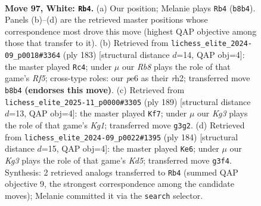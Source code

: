 \documentclass[11pt]{article}
\begin{document}
\clearpage

\begin{figure}[p]\centering
\begin{subfigure}{0.46\textwidth}\centering
\resizebox{\linewidth}{!}{%
\newchessgame
\chessboard[
  setfen={1R6/2k5/4pp1R/8/4P3/5PK1/8/r7 w - - 6 97},
  showmover=false,
  pgfstyle=straightmove, color=movearrow, markmove={b8-b4}
]}
\caption{}
\end{subfigure}\hfill
\begin{subfigure}{0.46\textwidth}\centering
\resizebox{\linewidth}{!}{%
\newchessgame
\chessboard[
  setfen={8/6k1/6p1/7p/5r1P/8/7R/4K3 b - - 45 92},
  showmover=false,
  pgfstyle=straightmove, color=movearrow, markmove={f4-c4}
]}
\caption{}
\end{subfigure}
\\[4pt]
\begin{subfigure}{0.46\textwidth}\centering
\resizebox{\linewidth}{!}{%
\newchessgame
\chessboard[
  setfen={R5k1/6p1/7p/7P/6P1/1r6/5K2/8 b - - 46 95},
  showmover=false,
  pgfstyle=straightmove, color=movearrow, markmove={g8-f7}
]}
\caption{}
\end{subfigure}\hfill
\begin{subfigure}{0.46\textwidth}\centering
\resizebox{\linewidth}{!}{%
\newchessgame
\chessboard[
  setfen={5k2/1R4p1/7p/3KP2P/r7/8/8/8 w - - 4 93},
  showmover=false,
  pgfstyle=straightmove, color=movearrow, markmove={d5-e6}
]}
\caption{}
\end{subfigure}
\caption{\textbf{Move 97, White: \texttt{Rb4}.} (a) Our position; Melanie plays \texttt{Rb4} (\texttt{b8b4}). Panels (b)--(d) are the retrieved master positions whose correspondence most drove this move (highest QAP objective among those that transfer to it). (b) Retrieved from \texttt{lichess\_elite\_2024-09\_p0018\#3364} (ply 183) [structural distance $d$=14, QAP obj=4]: the master played \texttt{Rc4}; under $\mu$ our \emph{Rb8} plays the role of that game's \emph{Rf5}; cross-type roles: our \emph{p}e6 as their \emph{r}h2; transferred move \texttt{b8b4} \textbf{(endorses this move)}. (c) Retrieved from \texttt{lichess\_elite\_2025-11\_p0000\#3305} (ply 189) [structural distance $d$=13, QAP obj=4]: the master played \texttt{Kf7}; under $\mu$ our \emph{Kg3} plays the role of that game's \emph{Kg1}; transferred move \texttt{g3g2}. (d) Retrieved from \texttt{lichess\_elite\_2024-09\_p0022\#1395} (ply 184) [structural distance $d$=15, QAP obj=4]: the master played \texttt{Ke6}; under $\mu$ our \emph{Kg3} plays the role of that game's \emph{Kd5}; transferred move \texttt{g3f4}. Synthesis: 2 retrieved analogs transferred to \texttt{Rb4} (summed QAP objective 9, the strongest correspondence among the candidate moves); Melanie committed it via the \texttt{search} selector.}
\label{fig:thought-m192}
\end{figure}
\end{document}
